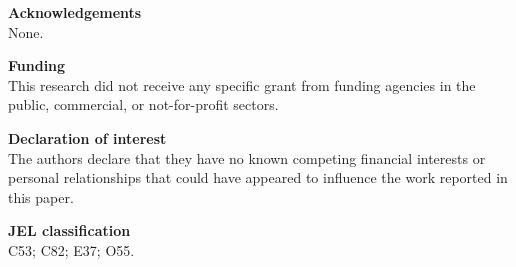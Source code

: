 \documentclass[12pt]{article}
\begin{document}
\textbf{Acknowledgements}\\
None.

\textbf{Funding}\\
This research did not receive any specific grant from funding agencies in the public, commercial, or not-for-profit sectors.

\textbf{Declaration of interest}\\
The authors declare that they have no known competing financial interests or personal relationships that could have appeared to influence the work reported in this paper.

\textbf{JEL classification}\\
C53; C82; E37; O55.
\end{document}
